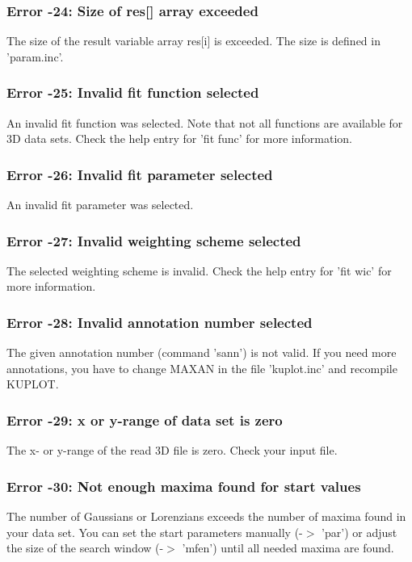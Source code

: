 \subsubsection{Error -24: Size of res[] array exceeded}
\par
The size of the result variable array res[i] is exceeded. The size 
is defined in 'param.inc'. 
\subsubsection{Error -25: Invalid fit function selected}
\par
An invalid fit function was selected. Note that not all functions 
are available for 3D data sets. Check the help entry for 'fit func' 
for more information. 
\subsubsection{Error -26: Invalid fit parameter selected}
\par
An invalid fit parameter was selected. 
\subsubsection{Error -27: Invalid weighting scheme selected}
\par
The selected weighting scheme is invalid. Check the help entry for 
'fit wic' for more information. 
\subsubsection{Error -28: Invalid annotation number selected}
\par
The given annotation number (command 'sann') is not valid. If you 
need more annotations, you have to change MAXAN in the file 
'kuplot.inc' and recompile KUPLOT. 
\subsubsection{Error -29: x or y-range of data set is zero}
\par
The x- or y-range of the read 3D file is zero. Check your input 
file. 
\subsubsection{Error -30: Not enough maxima found for start values}
\par
The number of Gaussians or Lorenzians exceeds the number of maxima 
found in your data set. You can set the start parameters manually 
(-$> $ 'par') or adjust the size of the search window (-$> $ 'mfen') 
until all needed maxima are found. 
